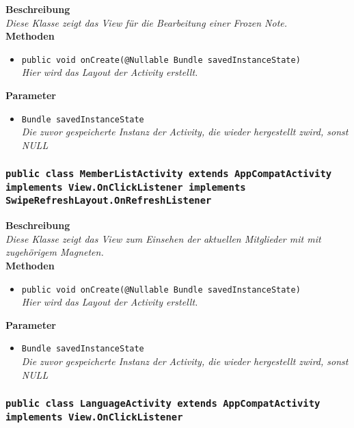 	\textbf{Beschreibung} \\
	\textit{Diese Klasse zeigt das View für die Bearbeitung einer Frozen Note.} \\

	\textbf{Methoden}
	\begin{itemize}
		\item\texttt{{public void onCreate(@Nullable Bundle savedInstanceState)}}\\
	\textit{Hier wird das Layout der Activity erstellt.}\\
	\end{itemize}

	\textbf{Parameter}
	\begin{itemize}
		\item\texttt{Bundle savedInstanceState}\\ 
	\textit{Die zuvor gespeicherte Instanz der Activity, die wieder hergestellt zwird, sonst NULL}\\
	\end{itemize} 

\subsubsection{\texttt{public class MemberListActivity extends AppCompatActivity implements View.OnClickListener implements SwipeRefreshLayout.OnRefreshListener}}

	\textbf{Beschreibung} \\
	\textit{Diese Klasse zeigt das View zum Einsehen der aktuellen Mitglieder mit
mit zugehörigem Magneten.} \\

	\textbf{Methoden}
	\begin{itemize}
		\item\texttt{{public void onCreate(@Nullable Bundle savedInstanceState)}}\\
	\textit{Hier wird das Layout der Activity erstellt.}\\
	\end{itemize}

	\textbf{Parameter}
	\begin{itemize}
		\item\texttt{Bundle savedInstanceState}\\  
	\textit{Die zuvor gespeicherte Instanz der Activity, die wieder hergestellt zwird, sonst NULL}\\
	\end{itemize} 

\subsubsection{\texttt{public class LanguageActivity extends AppCompatActivity implements View.OnClickListener}}

